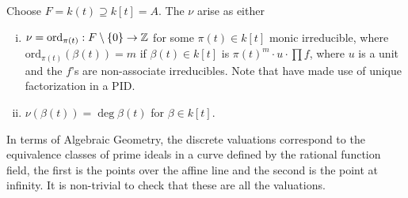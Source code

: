 \begin{ex}
Choose $F=k(t) \supseteq k[t]=A$. The $\nu$ arise as either 
	\begin{enumerate}[(i)]
	\item $\nu= \text{ord}_{\pi(t)}: F \setminus \{0\} \to \mathbb{Z}$ for some $\pi(t) \in k[t]$ monic irreducible, where $\text{ord}_{\pi(t)}(\beta(t))=m$ if $\beta(t) \in k[t]$ is $\pi(t)^m \cdot u \cdot \prod f$, where $u$ is a unit and the $f$'s are non-associate irreducibles. Note that have made use of unique factorization in a PID.
	\item $\nu(\beta(t))=\deg \beta(t)$ for $\beta \in k[t]$.
	\end{enumerate}
In terms of Algebraic Geometry, the discrete valuations correspond to the equivalence classes of prime ideals in a curve defined by the rational function field, the first is the points over the affine line and the second is the point at infinity. It is non-trivial to check that these are all the valuations. 
\end{ex}













